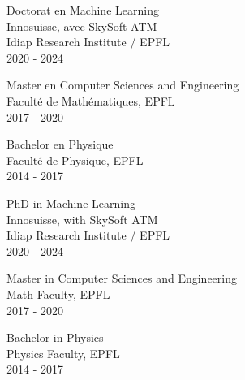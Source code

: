 \ifFrench

  \color{deepgray}
  \large Doctorat en Machine Learning \\
  \color{mediumgray} \small
  Innosuisse, avec SkySoft ATM \\
  Idiap Research Institute / EPFL \\
  2020 - 2024

  \commonvspace
  \color{deepgray}
  \large Master en Computer Sciences and Engineering \\
  \color{mediumgray} \small
  Faculté de Mathématiques, EPFL \\
  2017 - 2020

  \commonvspace
  \color{deepgray}
  \large Bachelor en Physique \\
  \color{mediumgray} \small
  Faculté de Physique, EPFL \\
  2014 - 2017
\else

  \color{deepgray}
  \large PhD in Machine Learning \\
  \color{mediumgray} \small
  Innosuisse, with SkySoft ATM \\
  Idiap Research Institute / EPFL \\
  2020 - 2024

  \commonvspace
  \color{deepgray}
  \large Master in Computer Sciences and Engineering \\
  \color{mediumgray} \small
  Math Faculty, EPFL \\
  2017 - 2020

  \commonvspace
  \color{deepgray}
  \large Bachelor in Physics \\
  \color{mediumgray} \small
  Physics Faculty, EPFL \\
  2014 - 2017
\fi